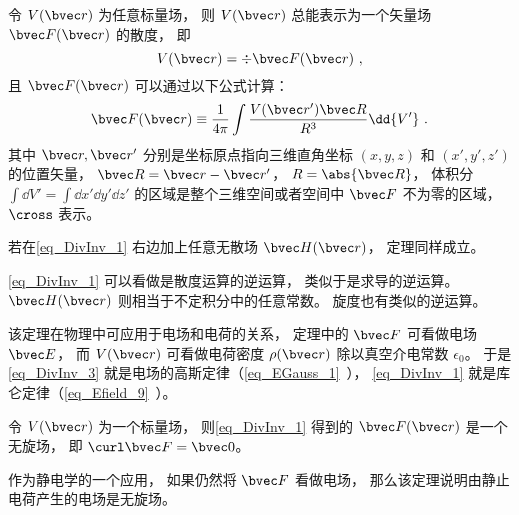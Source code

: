

\begin{theorem}{}
令 $V(\bvec r)$ 为任意标量场， 则 $V(\bvec r)$ 总能表示为一个矢量场 $\bvec F(\bvec r)$ 的散度， 即
\begin{equation}\label{eq_DivInv_3}
V(\bvec r) = \div \bvec F(\bvec r)~,
\end{equation}
且 $\bvec F(\bvec r)$ 可以通过以下公式计算：
\begin{equation}\label{eq_DivInv_1}
\bvec F(\bvec r) \equiv \frac{1}{4\pi}\int \frac{V(\bvec r') \bvec R}{R^3} \dd{V'}~.
\end{equation}
其中 $\bvec r, \bvec r'$ 分别是坐标原点指向三维直角坐标 $(x, y, z)$ 和 $(x', y', z')$ 的位置矢量， $\bvec R = \bvec r - \bvec r'$， $R = \abs{\bvec R}$， 体积分 $\int\dd{V'} = \int\dd{x'}\dd{y'}\dd{z'}$ 的区域是整个三维空间或者空间中 $\bvec F$ 不为零的区域， $\cross$ 表示。

若在\autoref{eq_DivInv_1} 右边加上任意无散场 $\bvec H(\bvec r)$， 定理同样成立。
\end{theorem}

\autoref{eq_DivInv_1} 可以看做是散度运算的逆运算， 类似于是求导的逆运算。 $\bvec H(\bvec r)$ 则相当于不定积分中的任意常数。 旋度也有类似的逆运算。

该定理在物理中可应用于电场和电荷的关系， 定理中的 $\bvec F$ 可看做电场 $\bvec E$， 而 $V(\bvec r)$ 可看做电荷密度 $\rho(\bvec r)$ 除以真空介电常数 $\epsilon_0$。 于是\autoref{eq_DivInv_3} 就是电场的高斯定律（\autoref{eq_EGauss_1}~）， \autoref{eq_DivInv_1} 就是库仑定律（\autoref{eq_Efield_9}~）。

\begin{theorem}{}\label{the_DivInv_1}
令 $V(\bvec r)$ 为一个标量场， 则\autoref{eq_DivInv_1} 得到的 $\bvec F(\bvec r)$ 是一个无旋场， 即 $\curl \bvec F = \bvec 0$。
\end{theorem}

作为静电学的一个应用， 如果仍然将 $\bvec F$ 看做电场， 那么该定理说明由静止电荷产生的电场是无旋场。

